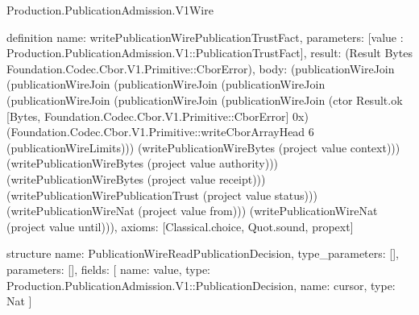 \begin{lexlean}{Production.PublicationAdmission.V1Wire}
\begin{semanticmodule}
definition{
  name: writePublicationWirePublicationTrustFact,
  parameters: [value : Production.PublicationAdmission.V1::PublicationTrustFact],
  result: (Result Bytes Foundation.Codec.Cbor.V1.Primitive::CborError),
  body: (publicationWireJoin (publicationWireJoin (publicationWireJoin (publicationWireJoin (publicationWireJoin (publicationWireJoin (publicationWireJoin (ctor Result.ok [Bytes, Foundation.Codec.Cbor.V1.Primitive::CborError] 0x) (Foundation.Codec.Cbor.V1.Primitive::writeCborArrayHead 6 (publicationWireLimits))) (writePublicationWireBytes (project value context))) (writePublicationWireBytes (project value authority))) (writePublicationWireBytes (project value receipt))) (writePublicationWirePublicationTrust (project value status))) (writePublicationWireNat (project value from))) (writePublicationWireNat (project value until))),
  axioms: [Classical.choice, Quot.sound, propext]
}

structure{
  name: PublicationWireReadPublicationDecision,
  type_parameters: [],
  parameters: [],
  fields: [
    {name: value, type: Production.PublicationAdmission.V1::PublicationDecision},
    {name: cursor, type: Nat}
  ]
}


\end{semanticmodule}
\end{lexlean}
